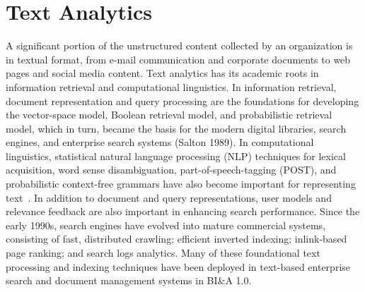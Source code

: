 \section*{Text Analytics}

A significant portion of the unstructured content collected by
an organization is in textual format, from e-mail communication
and corporate documents to web pages and social
media content. Text analytics has its academic roots in
information retrieval and computational linguistics. In information
retrieval, document representation and query processing
are the foundations for developing the vector-space
model, Boolean retrieval model, and probabilistic retrieval
model, which in turn, became the basis for the modern digital
libraries, search engines, and enterprise search systems
(Salton 1989). In computational linguistics, statistical natural
language processing (NLP) techniques for lexical acquisition,
word sense disambiguation, part-of-speech-tagging (POST),
and probabilistic context-free grammars have also become
important for representing text~\cite{Manning:1999}.
In addition to document and query representations, user
models and relevance feedback are also important in
enhancing search performance.
Since the early 1990s, search engines have evolved into
mature commercial systems, consisting of fast, distributed
crawling; efficient inverted indexing; inlink-based page
ranking; and search logs analytics. Many of these foundational
text processing and indexing techniques have been
deployed in text-based enterprise search and document
management systems in BI\&A 1.0.


